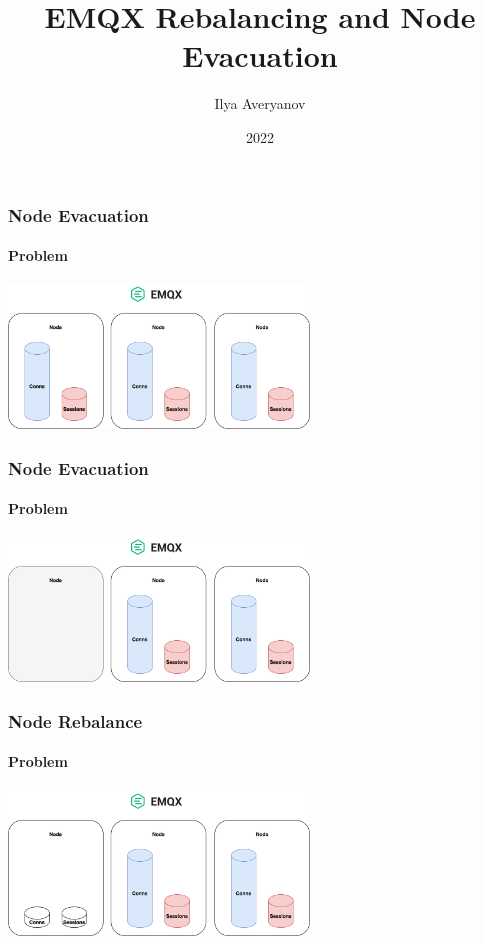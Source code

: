 \documentclass{beamer}
\title{EMQX Rebalancing and Node Evacuation}
\author{Ilya Averyanov}
\institute{EMQX}
\date{2022}
\begin{document}
\frame{\titlepage}

\begin{frame}
    \frametitle{Node Evacuation}
    \framesubtitle{Problem}

    \begin{center}
        \includegraphics[width=8cm, keepaspectratio]{images/evacuation-scheme0.png}
    \end{center}
\end{frame}

\begin{frame}
    \frametitle{Node Evacuation}
    \framesubtitle{Problem}

    \begin{center}
        \includegraphics[width=8cm, keepaspectratio]{images/evacuation-scheme1.png}
    \end{center}
\end{frame}

\begin{frame}
    \frametitle{Node Rebalance}
    \framesubtitle{Problem}

    \begin{center}
        \includegraphics[width=8cm, keepaspectratio]{images/rebalance-scheme.png}
    \end{center}
\end{frame}
\end{document}
